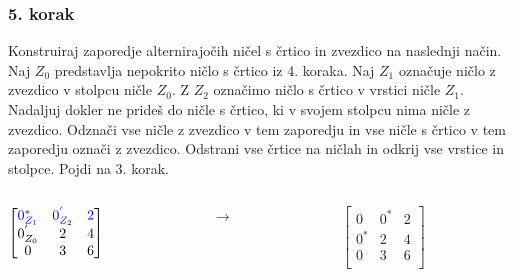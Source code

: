 \documentclass{beamer}
\begin{document}
\begin{frame}
    \frametitle{5. korak}
    \begin{block}{}
        Konstruiraj zaporedje alternirajočih ničel s črtico in zvezdico na naslednji način.
        Naj $Z_0$ predstavlja nepokrito ničlo s črtico iz 4. koraka. Naj $Z_1$ označuje
        ničlo z zvezdico v stolpcu ničle $Z_0$. Z $Z_2$ označimo ničlo s črtico v vrstici
        ničle $Z_1$. Nadaljuj dokler ne prideš do ničle s črtico, ki v svojem stolpcu nima
        ničle z zvezdico. Odznači vse ničle z zvezdico v tem zaporedju in vse ničle s črtico v tem
        zaporedju označi z zvezdico. Odstrani vse črtice na ničlah in odkrij vse vrstice in stolpce.
        Pojdi na 3. korak.
    \end{block}
    \hfill
    \begin{columns}[t]
        \begin{column}{0.25\linewidth}
            $\begin{bmatrix}
                \textcolor{blue}{0^{*}_{Z_1}} & \textcolor{blue}{0^{'}_{Z_2}} & \textcolor{blue}{2}\\
                0^{'}_{Z_0} & 2 & 4\\
                0 & 3 & 6\\	
            \end{bmatrix}$
        \end{column}
        \begin{column}{0.25\linewidth}
         \centering
         $ \rightarrow $
        \end{column}
        \hfill
        \begin{column}{0.25\linewidth}
            \centering
            $\begin{bmatrix}
                0 & 0^{*} & 2\\
                0^{*} & 2 & 4\\
                0 & 3 & 6\\	
            \end{bmatrix}$
        \end{column}
    \end{columns}
\end{frame}
\end{document}
